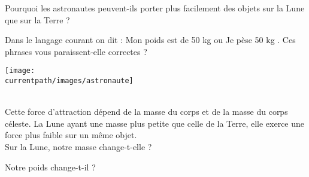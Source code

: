 \vspace*{-10mm}
\begin{enigme}
   \vspace*{-2mm}
      \begin{minipage}{11.5cm}
         Pourquoi les astronautes peuvent-ils porter plus facilement des objets sur la Lune que sur la Terre ?

         \vspace*{2mm}\dotfill
         
         Dans le langage courant on dit : \og Mon poids est de 50 kg \fg{} ou \og Je pèse 50 kg \fg{}. Ces phrases vous paraissent-elle correctes ?

         \vspace*{2mm}\dotfill
      \end{minipage}
      \qquad
      \begin{minipage}{4.5cm}
         \texttt{[image: \\currentpath/images/astronaute]}
      \end{minipage}
   
       \\ [1mm]
      Cette force d’attraction dépend de la masse du corps et de la masse du corps céleste. La Lune ayant une masse plus petite que celle de la Terre, elle exerce une force plus faible sur un même objet. \\ [2mm]
      Sur la Lune, notre masse change-t-elle ? \dotfill 
      
      \vspace*{2mm}

      Notre poids change-t-il ? \dotfill
   

\end{enigme}
